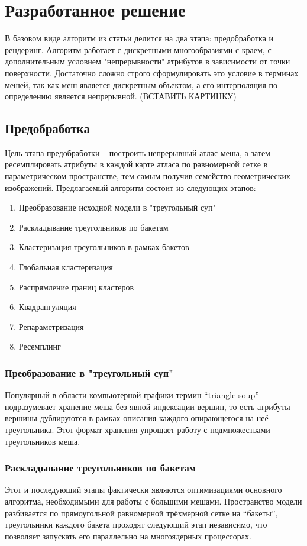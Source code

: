 \documentclass[12pt]{extarticle}
\begin{document}
\section{Разработанное решение}
\label{sec:algorithm}

В базовом виде алгоритм из статьи \cite{niski2007multi} делится на два этапа: предобработка и рендеринг. Алгоритм работает с дискретными многообразиями с краем, с дополнительным условием "непрерывности" атрибутов в зависимости от точки поверхности. Достаточно сложно строго сформулировать это условие в терминах мешей, так как меш является дискретным объектом, а его интерполяция по определению является непрерывной. (ВСТАВИТЬ КАРТИНКУ)

\subsection{Предобработка}
Цель этапа предобработки -- построить непрерывный атлас меша, а затем ресемплировать атрибуты в каждой карте атласа по равномерной сетке в параметрическом пространстве, тем самым получив семейство геометрических изображений. Предлагаемый алгоритм состоит из следующих этапов:
\begin{enumerate}
\item Преобразование исходной модели в "треугольный суп"
\item Раскладывание треугольников по бакетам
\item Кластеризация треугольников в рамках бакетов
\item Глобальная кластеризация
\item Распрямление границ кластеров
\item Квадрангуляция
\item Репараметризация
\item Ресемплинг
\end{enumerate}

\subsubsection{Преобразование в "треугольный суп"}
Популярный в области компьютерной графики термин ``triangle soup'' подразумевает хранение меша без явной индексации вершин, то есть атрибуты вершины дублируются в рамках описания каждого опирающегося на неё треугольника. Этот формат хранения упрощает работу с подмножествами треугольников меша.

\subsubsection{Раскладывание треугольников по бакетам}
Этот и последующий этапы фактически являются оптимизациями основного алгоритма, необходимыми для работы с большими мешами. Пространство модели разбивается по прямоугольной равномерной трёхмерной сетке на ``бакеты'', треугольники каждого бакета проходят следующий этап независимо, что позволяет запускать его параллельно на многоядерных процессорах.
\end{document}
